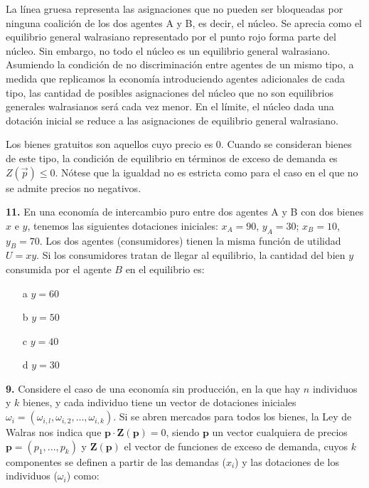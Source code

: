 \documentclass{nuevotema}
\begin{document}
La línea gruesa representa las asignaciones que no pueden ser bloqueadas por ninguna coalición de los dos agentes A y B, es decir, el núcleo. Se aprecia como el equilibrio general walrasiano representado por el punto rojo forma parte del núcleo. Sin embargo, no todo el núcleo es un equilibrio general walrasiano. Asumiendo la condición de no discriminación entre agentes de un mismo tipo, a medida que replicamos la economía introduciendo agentes adicionales de cada tipo, las cantidad de posibles asignaciones del núcleo que no son equilibrios generales walrasianos será cada vez menor. En el límite, el núcleo dada una dotación inicial se reduce a las asignaciones de equilibrio general walrasiano. 

\conceptos 


Los bienes gratuitos son aquellos cuyo precio es 0. Cuando se consideran bienes de este tipo, la condición de equilibrio en términos de exceso de demanda es $Z(\vec{p}) \leq 0$. Nótese que la igualdad no es estricta como para el caso en el que no se admite precios no negativos.

\preguntas

\textbf{11.} En una economía de intercambio puro entre dos agentes A y B con dos bienes $x$ e $y$, tenemos las siguientes dotaciones iniciales: $x_A = 90$, $y_A = 30$; $x_B = 10$, $y_B = 70$. Los dos agentes (consumidores) tienen la misma función de utilidad $U=xy$. Si los consumidores tratan de llegar al equilibrio, la cantidad del bien $y$ consumida por el agente $B$ en el equilibrio es:

\begin{itemize}
	\item[a] $y=60$
	\item[b] $y=50$
	\item[c] $y=40$
	\item[d] $y=30$
\end{itemize}



\textbf{9.} Considere el caso de una economía sin producción, en la que hay $n$ individuos y $k$ bienes, y cada individuo tiene un vector de dotaciones iniciales $\textbf{$\omega_i$} = (\omega_{i,l}, \omega_{i,2}, ... , \omega_{i,k})$. Si se abren mercados para todos los bienes, la Ley de Walras nos indica que $\textbf{p} \cdot \textbf{Z} (\textbf{p} ) = 0$, siendo $\textbf{p}$ un vector cualquiera de precios $\textbf{p} = (p_1, ..., p_k)$ y $\textbf{Z} (\textbf{p})$ el vector de funciones de exceso de demanda, cuyos $k$ componentes se definen a partir de las demandas ($x_i$) y las dotaciones de los individuos ($\omega_i$) como:
\end{document}
